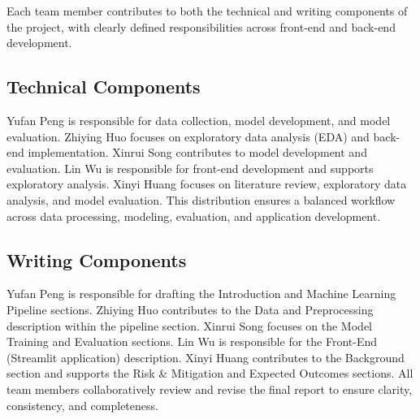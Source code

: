Each team member contributes to both the technical and writing components of the project, with clearly defined responsibilities across front-end and back-end development.

\subsection{Technical Components}

Yufan Peng is responsible for data collection, model development, and model evaluation. Zhiying Huo focuses on exploratory data analysis (EDA) and back-end implementation. Xinrui Song contributes to model development and evaluation. Lin Wu is responsible for front-end development and supports exploratory analysis. Xinyi Huang focuses on literature review, exploratory data analysis, and model evaluation. This distribution ensures a balanced workflow across data processing, modeling, evaluation, and application development.

\subsection{Writing Components}

Yufan Peng is responsible for drafting the Introduction and Machine Learning Pipeline sections. Zhiying Huo contributes to the Data and Preprocessing description within the pipeline section. Xinrui Song focuses on the Model Training and Evaluation sections. Lin Wu is responsible for the Front-End (Streamlit application) description. Xinyi Huang contributes to the Background section and supports the Risk \& Mitigation and Expected Outcomes sections. All team members collaboratively review and revise the final report to ensure clarity, consistency, and completeness.


